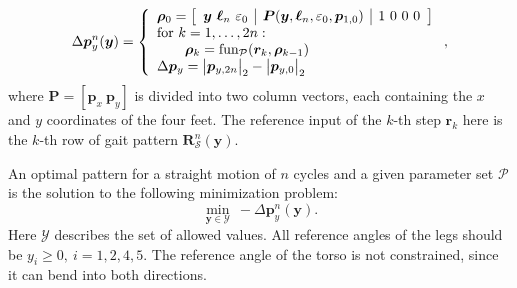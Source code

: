 \documentclass[letterpaper,10pt,conference]{ieeeconf}  %
\begin{document}
\begin{equation}
\Delta\bm{p}_y^n(\bm{y})
 = 
\left\lbrace
\begin{array}{l}
\bm{\rho}_0 = 
\left[
\begin{array}{c|c|c}
\bm{y} ~ \bm{\ell}_n ~ \varepsilon_0  & 
\bm{P}(\bm{y}, \bm{\ell}_n, \varepsilon_0, \bm{p}_{1,0}) & 
1~0~0~0
\end{array}
\right] \\

\textnormal{for } k = 1, \dots, 2n: \\
\qquad \bm{\rho}_k = \textnormal{fun}_{\mathcal{P}}(\bm{r}_k, \bm{\rho}_{k-1}) \\

\Delta\bm{p}_y = \big| \bm{p}_{y, 2n} \big|_2 - \big| \bm{p}_{y,0} \big|_2 \\
\end{array}
\right. ,
\end{equation}
where $\bm{P} = [\bm{p}_x~\bm{p}_y]$ is divided into two column vectors, each containing the $x$ and $y$ coordinates of the four feet.
The reference input of the $k$-th step $\bm{r}_k$ here is the $k$-th row of gait pattern $\bm{R}_\mathcal{S}^n(\bm{y})$.


An optimal pattern for a straight motion of $n$ cycles and a given parameter set $\mathcal{P}$ is the solution to the following minimization problem:
\begin{equation}
\min_{\bm{y} \in \mathcal{Y}} ~ -\Delta\bm{p}_y^n(\bm{y}).
\end{equation}
Here $\mathcal{Y}$ describes the set of allowed values.
All reference angles of the legs should be $y_i\geq0,~i=1,2,4,5$. 
The reference angle of the torso is not constrained, since it can bend into both directions.


\end{document}
